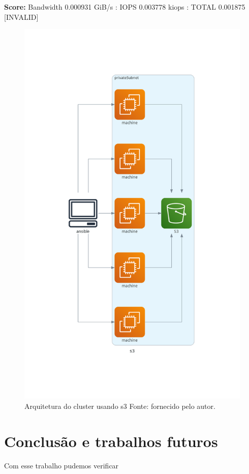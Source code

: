 \documentclass[article,a4paper,12pt,brazil,sumario=tradicional]{abntex2}
\begin{document}
\textbf{Score:} Bandwidth 0.000931 GiB/s : IOPS 0.003778 kiops : TOTAL 0.001875 [INVALID]
\begin{figure}[htb]
	\centering
	\includegraphics[width=1\textwidth]{s3.png}
	\caption{Arquitetura do cluster usando s3 Fonte: fornecido pelo autor.}
	\label{fig:s3}
\end{figure}

\section{Conclusão e trabalhos futuros}
Com esse trabalho pudemos verificar 
\end{document}
